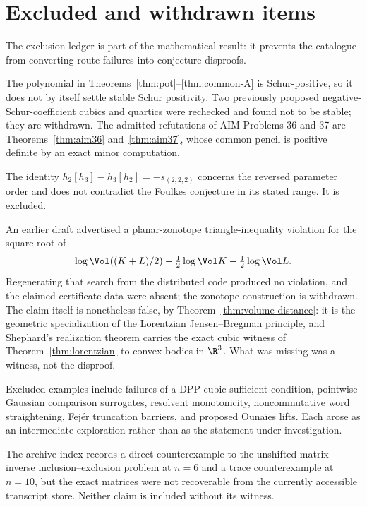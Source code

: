 \section{Excluded and withdrawn items}

The exclusion ledger is part of the mathematical result: it prevents the catalogue from converting route failures into conjecture disproofs.

\begin{audit}
The polynomial in Theorems~\ref{thm:pot}--\ref{thm:common-A} is Schur-positive, so it does not by itself settle stable Schur positivity.  Two previously proposed negative-Schur-coefficient cubics and quartics were rechecked and found not to be stable; they are withdrawn.  The admitted refutations of AIM Problems 36 and 37 are Theorems~\ref{thm:aim36} and~\ref{thm:aim37}, whose common pencil is positive definite by an exact minor computation.
\end{audit}

\begin{audit}
The identity $h_2[h_3]-h_3[h_2]=-s_{(2,2,2)}$ concerns the reversed parameter order and does not contradict the Foulkes conjecture in its stated range.  It is excluded.
\end{audit}

\begin{audit}
An earlier draft advertised a planar-zonotope triangle-inequality violation for the square root of
\[
\log\Vol((K+L)/2)-\tfrac12\log\Vol K-\tfrac12\log\Vol L.
\]
Regenerating that search from the distributed code produced no violation, and the claimed certificate data were absent; the zonotope construction is withdrawn.  The claim itself is nonetheless false, by Theorem~\ref{thm:volume-distance}: it is the geometric specialization of the Lorentzian Jensen--Bregman principle, and Shephard's realization theorem carries the exact cubic witness of Theorem~\ref{thm:lorentzian} to convex bodies in $\R^3$.  What was missing was a witness, not the disproof.
\end{audit}

\begin{audit}
Excluded examples include failures of a DPP cubic sufficient condition, pointwise Gaussian comparison surrogates, resolvent monotonicity, noncommutative word straightening, Fej\'er truncation barriers, and proposed Ouna\"ies lifts.  Each arose as an intermediate exploration rather than as the statement under investigation.
\end{audit}

\begin{audit}
The archive index records a direct counterexample to the unshifted matrix inverse inclusion--exclusion problem at $n=6$ and a trace counterexample at $n=10$, but the exact matrices were not recoverable from the currently accessible transcript store.  Neither claim is included without its witness.
\end{audit}

